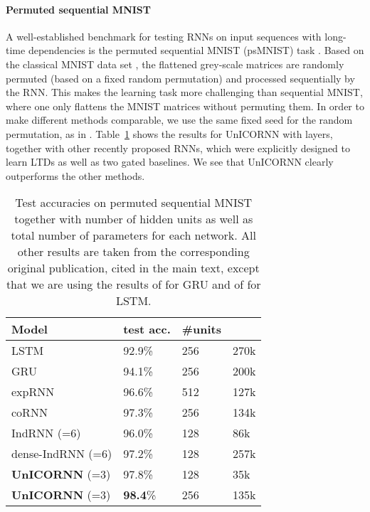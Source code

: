 \documentclass{article}
\newcommand{\Tref}[1]{Table~\ref{#1}}
\begin{document}
\paragraph{Permuted sequential MNIST}
A well-established benchmark for testing RNNs on input sequences with long-time dependencies is the permuted sequential MNIST (psMNIST) task \citep{seq_mnist}. Based on the classical MNIST data set \citep{mnist}, the flattened grey-scale matrices are randomly permuted (based on a fixed random permutation) and processed sequentially by the RNN. This makes the learning task more challenging than sequential MNIST, where one only flattens the MNIST matrices without permuting them. In order to make different methods comparable, we use the same fixed seed for the random permutation, as in \cite{exprnn,dtriv,scornn}. \Tref{tab:psmnist} shows the results for UnICORNN with  layers, together with other recently proposed RNNs, which were explicitly designed to learn LTDs as well as two gated baselines. We see that UnICORNN clearly outperforms the other methods.
\begin{table}[ht]
\caption{Test accuracies on permuted sequential MNIST together with number of hidden units as well as total number of parameters  for each network. All other results are taken from the corresponding original publication, cited in the main text, except that we are using the results of \cite{GRU_results} for GRU and of \cite{scornn} for LSTM.}
\label{tab:psmnist}
\vskip 0.15in
\begin{center}
\begin{small}
\begin{sc}
\begin{tabular}{llll}
\toprule
Model     & test acc. & \#units &  \\
\midrule
LSTM & 92.9\% & 256 & 270k\\
GRU & 94.1\% & 256 & 200k\\
expRNN & 96.6\%  & 512 & 127k\\
coRNN  & 97.3\% & 256 & 134k \\
IndRNN (=6)  & 96.0\% & 128 & 86k\\
dense-IndRNN (=6) & 97.2\% & 128 & 257k \\
\textbf{UnICORNN} (=3) & 97.8\% & 128 & 35k\\
\textbf{UnICORNN} (=3) & \textbf{98.4}\% & 256 & 135k\\
\bottomrule
\end{tabular}
\end{sc}
\end{small}
\end{center}
\vskip -0.1in
\end{table}
\end{document}

